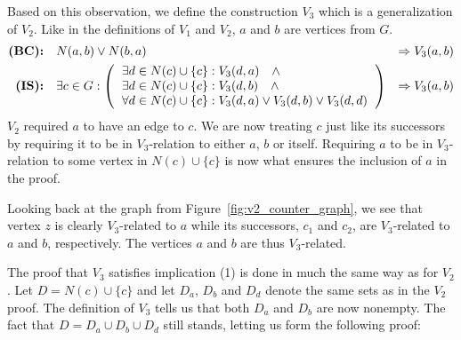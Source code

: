 Based on this observation, we define the construction $V_3$ which is a generalization of $V_2$.
Like in the definitions of $V_1$ and $V_2$, $a$ and $b$ are vertices from $G$.
\begin{align}
  \textbf{(BC):}&\quad N(a,b) \vee N(b,a) &\Rightarrow V_3(a,b)\label{eq:V2_BC}\\
  \textbf{(IS):}&\quad \exists c \in G:
  \left ( \begin{tabular}{l}
  $\exists d \in N(c) \cup \{ c \} : V_3(d,a) \quad \wedge$\\
  $\exists d \in N(c) \cup \{ c \} : V_3(d,b) \quad \wedge$\\
  $\forall d \in N(c) \cup \{ c \} : V_3(d,a) \vee V_3(d,b) \vee V_3(d,d)$
  \end{tabular} \right )
  &\Rightarrow V_3(a,b)\label{eq:V2_IS}
\end{align}
$V_2$ required $a$ to have an edge to $c$.
We are now treating $c$ just like its successors by requiring it to be in $V_3$-relation to either $a$, $b$ or itself.
Requiring $a$ to be in $V_3$-relation to some vertex in $N(c) \cup \{ c \}$ is now what ensures the inclusion of $a$ in the proof.

Looking back at the graph from Figure~\ref{fig:v2_counter_graph}, we see that vertex $z$ is clearly $V_3$-related to $a$ while its successors, $c_1$ and $c_2$, are $V_3$-related to $a$ and $b$, respectively.
The vertices $a$ and $b$ are thus $V_3$-related.

The proof that $V_3$ satisfies implication (1) is done in much the same way as for $V_2$.
Let $D = N(c) \cup \{ c \}$ and let $D_a$, $D_b$ and $D_d$ denote the same sets as in the $V_2$ proof.
The definition of $V_3$ tells us that both $D_a$ and $D_b$ are now nonempty.
The fact that $D = D_a \cup D_b \cup D_d$ still stands, letting us form the following proof:\par
\begin{figure}[!h]
  \centering
  \begin{prooftree*}
  \end{prooftree*}
  \caption{}
  \label{fig:proof_v3}
\end{figure}
